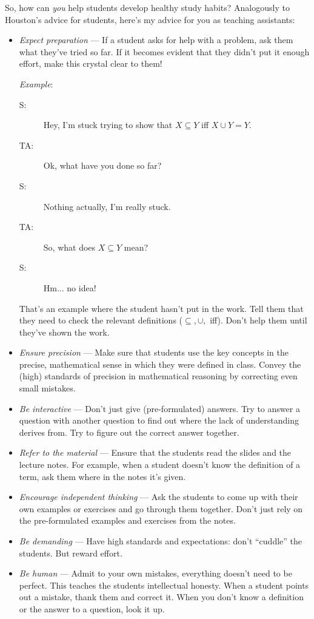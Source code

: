 \documentclass[a4paper,11pt,notitlepage]{uureport}
\begin{document}
So, how can \emph{you} help students develop healthy study habits?
Analogously to Houston's advice for students, here's my advice for you as teaching assistants:
\begin{itemize}

  \item \emph{Expect preparation} --- If a student asks for help with a problem, ask them what they've tried so far.
	If it becomes evident that they didn't put it enough effort, make this crystal clear to them!

	\emph{Example}:

	\begin{description}
	  \item[S:] Hey, I'm stuck trying to show that $X\subseteq Y$ iff $X\cup Y=Y$.
	  \item[TA:] Ok, what have you done so far?
	  \item[S:] Nothing actually, I'm really stuck.
	  \item[TA:] So, what does $X\subseteq Y$ mean?
	  \item[S:] Hm... no idea!
	\end{description}

	That's an example where the student hasn't put in the work.
	Tell them that they need to check the relevant definitions ($\subseteq, \cup,$ iff).
	Don't help them until they've shown the work.

	\item \emph{Ensure precision} --- Make sure that students use the key concepts in the precise, mathematical sense in which they were defined in class. Convey the (high) standards of precision in mathematical reasoning by correcting even small mistakes.
	
	\item \emph{Be interactive} --- Don't just give (pre-formulated) answers. Try to answer a question with another question to find out where the lack of understanding derives from. Try to figure out the correct answer together.
	
	\item \emph{Refer to the material} --- Ensure that the students read the slides and the lecture notes. For example, when a student doesn't know the definition of a term, ask them where in the notes it's given.
		 
	 \item \emph{Encourage independent thinking} --- Ask the students to come up with their own examples or exercises and go through them together. Don't just rely on the pre-formulated examples and exercises from the notes.
	
	\item \emph{Be demanding} --- Have high standards and expectations: don't ``cuddle'' the students. But reward effort. 
	
	\item \emph{Be human} --- Admit to your own mistakes, everything doesn't need to be perfect. This teaches the students intellectual honesty. When a student points out a mistake, thank them and correct it. When you don't know a definition or the answer to a question, look it up.

\end{itemize}
\end{document}
